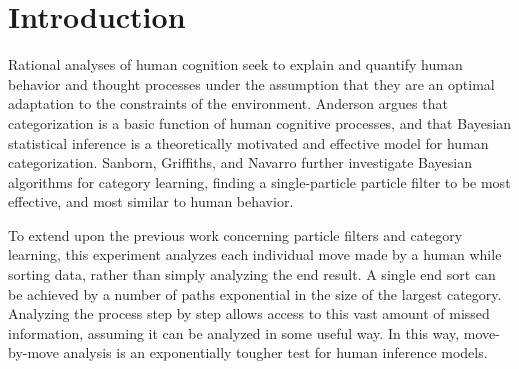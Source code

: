 \section{Introduction}
\label{sec:intro}

Rational analyses of human cognition seek to explain and quantify human behavior
and thought processes under the assumption that they are an optimal adaptation
to the constraints of the environment. Anderson \cite{anderson1991} argues that
categorization is a basic function of human cognitive processes, and that
Bayesian statistical inference is a theoretically motivated and effective model
for human categorization. Sanborn, Griffiths, and Navarro \cite{sanborn2010}
further investigate Bayesian algorithms for category learning, finding a
single-particle particle filter to be most effective, and most similar to human behavior.

To extend upon the previous work concerning particle filters and category
learning, this experiment analyzes each individual move made by a human while
sorting data, rather than simply analyzing the end result. A single end sort can
be achieved by a number of paths exponential in the size of the largest
category. Analyzing the process step by step allows access to this vast amount
of missed information, assuming it can be analyzed in some useful way. In this
way, move-by-move analysis is an exponentially tougher test for human inference
models. 